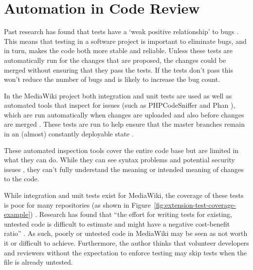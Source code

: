 \section{Automation in Code Review}

Past research has found that tests have a `weak positive relationship' to bugs \citep[p. 112]{6605914}. This means that testing in a software project is important to eliminate bugs, and in turn, makes the code both more stable and reliable. Unless these tests are automatically run for the changes that are proposed, the changes could be merged without ensuring that they pass the tests. If the tests don't pass this won't reduce the number of bugs and is likely to increase the bug count.

In the MediaWiki project both integration and unit tests are used  as well as automated tools that inspect for issues (such as PHPCodeSniffer  and Phan ), which are run automatically when changes are uploaded and also before changes are merged . These tests are run to help ensure that the master branches remain in an (almost) constantly deployable state .

These automated inspection tools cover the entire code base but are limited in what they can do. While they can see syntax problems  and potential security issues , they can't fully understand the meaning or intended meaning of changes to the code.

While integration and unit tests exist for MediaWiki, the coverage of these tests is poor for many repositories (as shown in Figure~\ref{fig:extension-test-coverage-example}) . Research has found that ``the effort for writing tests for existing, untested code is difficult to estimate and might have a negative cost-benefit ratio'' \citep[p. 4]{7107469}. As such, poorly or untested code in MediaWiki may be seen as not worth it or difficult to achieve. Furthermore, the author thinks that volunteer developers and reviewers without the expectation to enforce testing may skip tests when the file is already untested.

